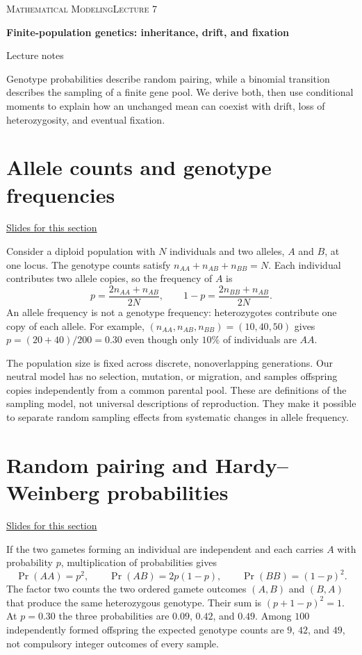 \documentclass[11pt,letterpaper]{article}
\theoremstyle{definition}\newtheorem{definition}{Definition}\newtheorem{example}{Example}
\numberwithin{equation}{section}
\begin{document}
{\small\scshape Mathematical Modeling\hfill Lecture 7}\par\medskip
{\raggedright{}\LARGE\bfseries\color{ink} Finite-population genetics: inheritance, drift, and fixation\par}\medskip
{\small Lecture notes}\par\bigskip
Genotype probabilities describe random pairing, while a binomial transition describes the sampling of a finite gene pool. We derive both, then use conditional moments to explain how an unchanged mean can coexist with drift, loss of heterozygosity, and eventual fixation.

\section{Allele counts and genotype frequencies}
\hypertarget{note-allele-counts-and-genotype-frequencies}{}\label{note:allele-counts-and-genotype-frequencies}
{\small \href{slides.html\#frame=diploid-accounting\&step=1}{Slides for this section}}\par
Consider a diploid population with $N$ individuals and two alleles, $A$ and $B$, at one locus. The genotype counts satisfy $n_{AA}+n_{AB}+n_{BB}=N$. Each individual contributes two allele copies, so the frequency of $A$ is
\[
p=\frac{2n_{AA}+n_{AB}}{2N},\qquad 1-p=\frac{2n_{BB}+n_{AB}}{2N}.
\]
An allele frequency is not a genotype frequency: heterozygotes contribute one copy of each allele. For example, $(n_{AA},n_{AB},n_{BB})=(10,40,50)$ gives $p=(20+40)/200=0.30$ even though only $10\%$ of individuals are $AA$.

The population size is fixed across discrete, nonoverlapping generations. Our neutral model has no selection, mutation, or migration, and samples offspring copies independently from a common parental pool. These are definitions of the sampling model, not universal descriptions of reproduction. They make it possible to separate random sampling effects from systematic changes in allele frequency.
\section{Random pairing and Hardy--Weinberg probabilities}
\hypertarget{note-random-pairing-and-hardy-weinberg-probabilities}{}\label{note:random-pairing-and-hardy-weinberg-probabilities}
{\small \href{slides.html\#frame=independent-gamete-pairing-figure\&step=1}{Slides for this section}}\par
If the two gametes forming an individual are independent and each carries $A$ with probability $p$, multiplication of probabilities gives
\[
\Pr(AA)=p^2,\qquad \Pr(AB)=2p(1-p),\qquad \Pr(BB)=(1-p)^2.
\]
The factor two counts the two ordered gamete outcomes $(A,B)$ and $(B,A)$ that produce the same heterozygous genotype. Their sum is $(p+1-p)^2=1$. At $p=0.30$ the three probabilities are $0.09$, $0.42$, and $0.49$. Among $100$ independently formed offspring the expected genotype counts are $9$, $42$, and $49$, not compulsory integer outcomes of every sample.
\end{document}
